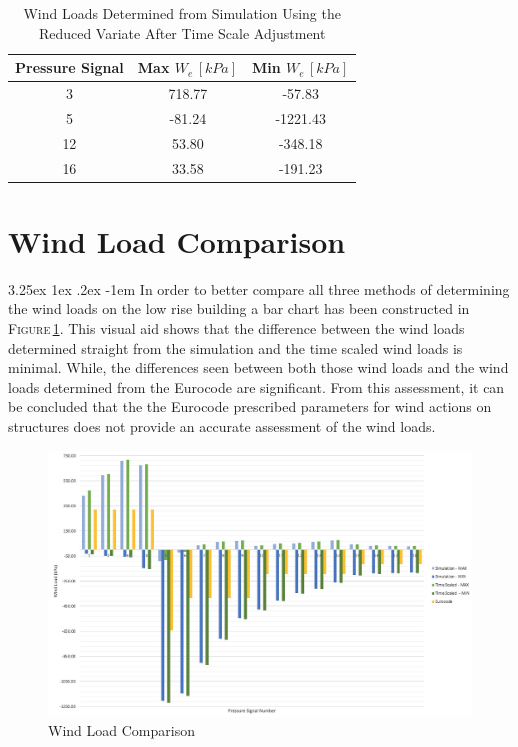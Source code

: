 \documentclass[11pt,a4paper,titlepage]{report}
\makeatletter
\renewcommand\paragraph{\@startsection{paragraph}{5}{\z@}%
  {3.25ex \@plus1ex \@minus.2ex}%
  {-1em}%
  {\normalfont\normalsize\bfseries}}
\makeatother
\begin{document}
\begin{table}[h]
    \centering
    \begin{tabular}{c|c|c}
      Pressure Signal & Max $W_e\,[kPa]$ & Min $W_e\,[kPa]$ \\
      \hline
      3  & 718.77 & -57.83   \\
5  & -81.24 & -1221.43 \\
12 & 53.80  & -348.18  \\
16 & 33.58  & -191.23 
    \end{tabular}
    \caption{Wind Loads Determined from Simulation Using the Reduced Variate After Time Scale Adjustment}
    \label{tab:wind loads time scale reduced variate}
\end{table}
\section{Wind Load Comparison}
\paragraph{}In order to better compare all three methods of determining the wind loads on the low rise building a bar chart has been constructed in \textsc{Figure}\,\ref{fig:Wind Load Comparison}. This visual aid shows that the difference between the wind loads determined straight from the simulation and the time scaled wind loads is minimal. While, the differences seen between both those wind loads and the wind loads determined from the Eurocode are significant. From this assessment, it can be concluded that the the Eurocode prescribed parameters for wind actions on structures does not provide an accurate assessment of the wind loads.
\begin{figure}
    \centering
    \includegraphics[width=16cm]{Wind_Load_Comparison.jpeg}
    \caption{Wind Load Comparison}
    \label{fig:Wind Load Comparison}
\end{figure}
\end{document}
